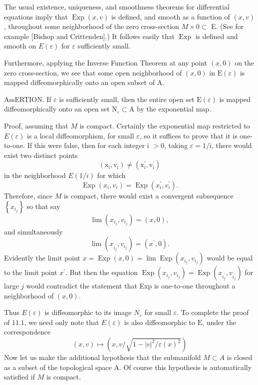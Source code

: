 \documentclass[10pt]{article}
\begin{document}
The usual existence, uniqueness, and smoothness theorems for differential equations imply that $\operatorname{Exp}(x, v)$ is defined, and smooth as a function of $(x, v)$, throughout some neighborhood of the zero cross-section $M \times 0 \subset$ E. (See for example [Bishop and Crittenden].) It follows easily that $\operatorname{Exp}$ is defined and smooth on $E(\varepsilon)$ for $\varepsilon$ sufficiently small.

Furthermore, applying the Inverse Function Theorem at any point $(x, 0)$ on the zero cross-section, we see that some open neighborhood of $(x, 0)$ in $\mathrm{E}(\varepsilon)$ is mapped diffeomorphically onto an open subset of A.

AssERTION. If $\varepsilon$ is sufficiently small, then the entire open set $\mathrm{E}(\varepsilon)$ is mapped diffeomorphically onto an open set $\mathrm{N}_{\varepsilon} \subset \mathrm{A}$ by the exponential map.

Proof, assuming that $M$ is compact. Certainly the exponential map restricted to $E(\varepsilon)$ is a local diffeomorphism, for small $\varepsilon$, so it suffices to prove that it is one-to-one. If this were false, then for each integer i $>0$, taking $\varepsilon=1 / \mathrm{i}$, there would exist two distinct points
$$
\left(\mathrm{x}_{\mathrm{i}}, \mathrm{v}_{\mathrm{i}}\right) \neq\left(\mathrm{x}_{\mathrm{i}}^{\prime}, \mathrm{v}_{\mathrm{i}}^{\prime}\right)
$$
in the neighborhood $E(1 / i)$ for which
$$
\operatorname{Exp}\left(x_{i}, v_{i}\right)=\operatorname{Exp}\left(x_{i}^{\prime}, v_{i}^{\prime}\right) .
$$
Therefore, since $M$ is compact, there would exist a convergent subsequence $\left\{x_{i_{j}}\right\}$ so that say
$$
\lim \left(x_{i_{j}}, v_{i_{j}}\right)=(x, 0),
$$
and simultaneously
$$
\lim \left(x_{i_{j}^{\prime}}, v_{i_{j}}\right)=\left(x^{\prime}, 0\right) .
$$
Evidently the limit point $x=\operatorname{Exp}(x, 0)=\lim \operatorname{Exp}\left(x_{i_{j}}, v_{i_{j}}\right)$ would be equal to the limit point $x^{\prime}$. But then the equation $\operatorname{Exp}\left(x_{i_{j}}, v_{i_{j}}\right)=\operatorname{Exp}\left(x_{i_{j}^{\prime}}, v_{i_{j}^{\prime}}\right)$ for large $j$ would contradict the statement that Exp is one-to-one throughout a neighborhood of $(x, 0)$.

Thus $E(\varepsilon)$ is diffeomorphic to its image $N_{\varepsilon}$ for small $\varepsilon$. To complete the proof of $11.1$, we need only note that $E(\varepsilon)$ is also diffeomorphic to $\mathrm{E}$, under the correspondence
$$
(x, v) \mapsto\left(x, v / \sqrt{1-|v|^{2} / \varepsilon(x)^{2}}\right)
$$
Now let us make the additional hypothesis that the submanifold $M \subset A$ is closed as a subset of the topological space A. Of course this hypothesis is automatically satisfied if $M$ is compact.
\end{document}
